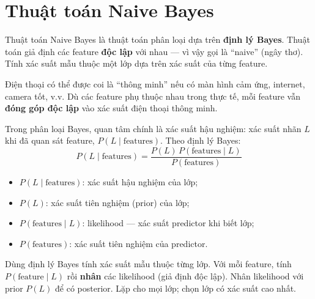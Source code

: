 \section{Thuật toán Naive Bayes}
\label{sec:naive-bayes}

\begin{dinhnghia}[title={Naive Bayes là gì?}]
Thuật toán Naive Bayes là thuật toán phân loại dựa trên \textbf{định lý Bayes}.
Thuật toán giả định các feature \textbf{độc lập} với nhau --- vì vậy gọi là ``naive'' (ngây thơ).
Tính xác suất mẫu thuộc một lớp dựa trên xác suất của từng feature.
\end{dinhnghia}

\begin{vidu}[title={Ví dụ điện thoại thông minh}]
Điện thoại có thể được coi là ``thông minh'' nếu có màn hình cảm ứng, internet, camera tốt, v.v.
Dù các feature phụ thuộc nhau trong thực tế, mỗi feature vẫn \textbf{đóng góp độc lập} vào xác suất điện thoại thông minh.
\end{vidu}

\begin{dinhnghia}[title={Xác suất hậu nghiệm trong phân loại Bayes}]
Trong phân loại Bayes, quan tâm chính là xác suất hậu nghiệm: xác suất nhãn $L$ khi đã quan sát feature, $P(L \mid \text{features})$.
Theo định lý Bayes:
\[
P(L \mid \text{features}) =
\frac{P(L)\, P(\text{features} \mid L)}{P(\text{features})}
\]
\end{dinhnghia}

\begin{ynghia}[title={Ý nghĩa các thành phần}]
\begin{itemize}
  \item $P(L \mid \text{features})$: xác suất hậu nghiệm của lớp;
  \item $P(L)$: xác suất tiên nghiệm (prior) của lớp;
  \item $P(\text{features} \mid L)$: likelihood --- xác suất predictor khi biết lớp;
  \item $P(\text{features})$: xác suất tiên nghiệm của predictor.
\end{itemize}
\end{ynghia}

\begin{phuongphap}[title={Quy trình Naive Bayes}]
Dùng định lý Bayes tính xác suất mẫu thuộc từng lớp.
Với mỗi feature, tính $P(\text{feature} \mid L)$ rồi \textbf{nhân} các likelihood (giả định độc lập).
Nhân likelihood với prior $P(L)$ để có posterior.
Lặp cho mọi lớp; chọn lớp có xác suất cao nhất.
\end{phuongphap}

